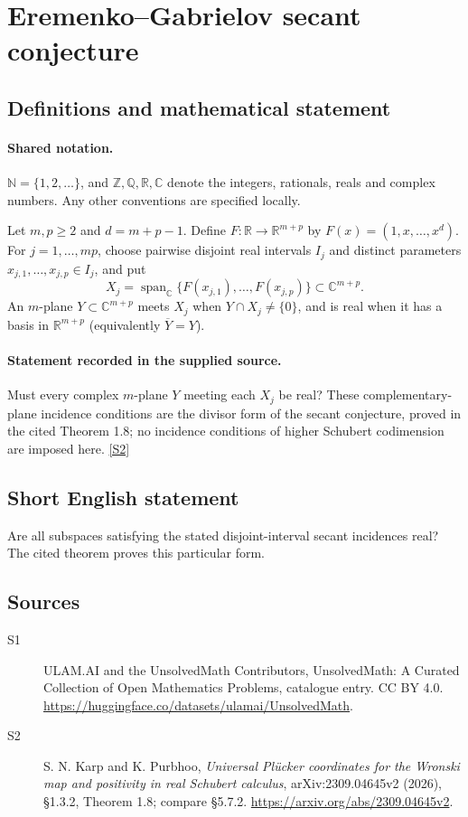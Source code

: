 \documentclass[11pt]{article}
\newcommand{\sref}[2]{\hyperlink{source:#1:#2}{[S#2]}}
\begin{document}
\section{Eremenko–Gabrielov secant conjecture}\label{statement}

\subsection{Definitions and mathematical statement}

\paragraph{Shared notation.}$\mathbb N=\{1,2,\ldots\}$, and $\mathbb Z,\mathbb Q,\mathbb R,\mathbb C$ denote the integers, rationals, reals and complex numbers. Any other conventions are specified locally.


Let $m,p\geq2$ and $d=m+p-1$. Define $F:\mathbb R\to\mathbb R^{m+p}$ by $F(x)=(1,x,\ldots,x^d)$. For $j=1,\ldots,mp$, choose pairwise disjoint real intervals $I_j$ and distinct parameters $x_{j,1},\ldots,x_{j,p}\in I_j$, and put
\[X_j=\operatorname{span}_{\mathbb C}\{F(x_{j,1}),\ldots,F(x_{j,p})\}\subset\mathbb C^{m+p}.
\]
An $m$-plane $Y\subset\mathbb C^{m+p}$ meets $X_j$ when $Y\cap X_j\neq\{0\}$, and is real when it has a basis in $\mathbb R^{m+p}$ (equivalently $\overline Y=Y$).
\paragraph{Statement recorded in the supplied source.}
Must every complex $m$-plane $Y$ meeting each $X_j$ be real? These complementary-plane incidence conditions are the divisor form of the secant conjecture, proved in the cited Theorem 1.8; no incidence conditions of higher Schubert codimension are imposed here. \sref{statement}{2}
\subsection{Short English statement}
Are all subspaces satisfying the stated disjoint-interval secant incidences real? The cited theorem proves this particular form.
\subsection{Sources}
\begin{description}
\item[\hypertarget{source:statement:1}{S1}] ULAM.AI and the UnsolvedMath Contributors, UnsolvedMath: A Curated Collection of Open Mathematics Problems, catalogue entry. CC BY 4.0. \url{https://huggingface.co/datasets/ulamai/UnsolvedMath}.
\item[\hypertarget{source:statement:2}{S2}] S. N. Karp and K. Purbhoo, \emph{Universal Plücker coordinates for the Wronski map and positivity in real Schubert calculus}, arXiv:2309.04645v2 (2026), §1.3.2, Theorem 1.8; compare §5.7.2. \url{https://arxiv.org/abs/2309.04645v2}.
\end{description}
\label{end:statement}
\end{document}
